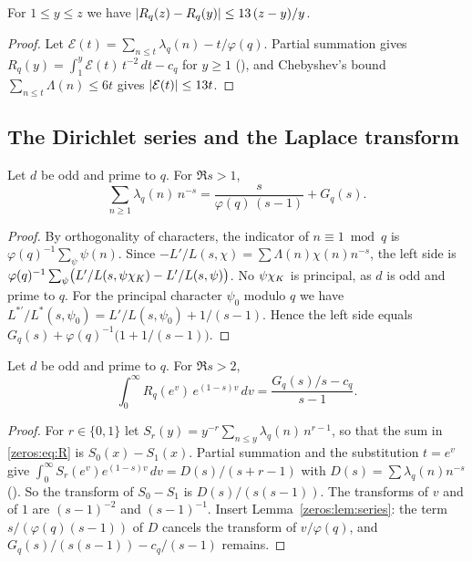 \begin{lemma}\label{zeros:lem:slow}
For $1 \le y \le z$ we have $\lvert R_q(z) - R_q(y)\rvert \le 13\,(z-y)/y$.
\end{lemma}

\begin{proof}
Let $\mathcal{E}(t) = \sum_{n \le t} \lambda_q(n) - t/\varphi(q)$. Partial summation gives
$R_q(y) = \int_1^y \mathcal{E}(t)\,t^{-2}\,dt - c_q$ for $y \ge 1$
(), and Chebyshev's bound
$\sum_{n \le t} \Lambda(n) \le 6t$ gives $\lvert\mathcal{E}(t)\rvert \le 13t$.
\end{proof}

\subsection{The Dirichlet series and the Laplace transform}

\begin{lemma}\label{zeros:lem:series}
Let $d$ be odd and prime to $q$. For $\Re s > 1$,
\[
  \sum_{n \ge 1} \lambda_q(n)\, n^{-s} = \frac{s}{\varphi(q)\,(s-1)} + G_q(s).
\]
\end{lemma}

\begin{proof}
By orthogonality of characters, the indicator of $n \equiv 1 \bmod q$ is
$\varphi(q)^{-1} \sum_\psi \psi(n)$. Since $-L'/L(s,\chi) = \sum \Lambda(n)\chi(n) n^{-s}$, the
left side is $\varphi(q)^{-1} \sum_\psi \bigl( L'/L(s,\psi\chi_K) - L'/L(s,\psi) \bigr)$. No
$\psi\chi_K$ is principal, as $d$ is odd and prime to $q$. For the principal
character $\psi_0$ modulo $q$ we have
$L^{*\prime}/L^*(s,\psi_0) = L'/L(s,\psi_0) + 1/(s-1)$. Hence the left side equals
$G_q(s) + \varphi(q)^{-1}\bigl(1 + 1/(s-1)\bigr)$.
\end{proof}

\begin{lemma}\label{zeros:lem:laplace}
Let $d$ be odd and prime to $q$. For $\Re s > 2$,
\[
  \int_0^\infty R_q(e^v)\, e^{(1-s)v}\, dv = \frac{G_q(s)/s - c_q}{s-1}.
\]
\end{lemma}

\begin{proof}
For $r \in \{0,1\}$ let $S_r(y) = y^{-r} \sum_{n \le y} \lambda_q(n)\, n^{r-1}$, so that the sum in
\eqref{zeros:eq:R} is $S_0(x) - S_1(x)$. Partial summation and the substitution $t = e^v$ give
$\int_0^\infty S_r(e^v) e^{(1-s)v}\,dv = D(s)/(s+r-1)$ with $D(s) = \sum \lambda_q(n) n^{-s}$
(). So the transform of $S_0 - S_1$ is $D(s)/(s(s-1))$. The
transforms of $v$ and of $1$ are $(s-1)^{-2}$ and $(s-1)^{-1}$. Insert
Lemma~\ref{zeros:lem:series}: the term $s/(\varphi(q)(s-1))$ of $D$ cancels the transform of
$v/\varphi(q)$, and $G_q(s)/(s(s-1)) - c_q/(s-1)$ remains.
\end{proof}

